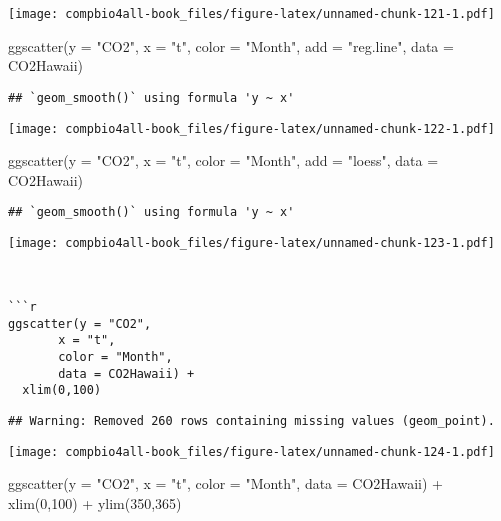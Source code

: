 \documentclass[
]{book}
\newenvironment{Shaded}{\begin{snugshade}}{\end{snugshade}}
\newcommand{\AttributeTok}[1]{\textcolor[rgb]{0.77,0.63,0.00}{#1}}
\newcommand{\DecValTok}[1]{\textcolor[rgb]{0.00,0.00,0.81}{#1}}
\newcommand{\FunctionTok}[1]{\textcolor[rgb]{0.00,0.00,0.00}{#1}}
\newcommand{\NormalTok}[1]{#1}
\newcommand{\SpecialCharTok}[1]{\textcolor[rgb]{0.00,0.00,0.00}{#1}}
\newcommand{\StringTok}[1]{\textcolor[rgb]{0.31,0.60,0.02}{#1}}
\begin{document}
\texttt{[image: compbio4all-book\_files/figure-latex/unnamed-chunk-121-1.pdf]}

\begin{Shaded}
\begin{Highlighting}[]
\FunctionTok{ggscatter}\NormalTok{(}\AttributeTok{y =} \StringTok{"CO2"}\NormalTok{,}
       \AttributeTok{x =} \StringTok{"t"}\NormalTok{,}
       \AttributeTok{color =} \StringTok{"Month"}\NormalTok{,}
       \AttributeTok{add =} \StringTok{"reg.line"}\NormalTok{,}
       \AttributeTok{data =}\NormalTok{ CO2Hawaii)}
\end{Highlighting}
\end{Shaded}

\begin{verbatim}
## `geom_smooth()` using formula 'y ~ x'
\end{verbatim}

\texttt{[image: compbio4all-book\_files/figure-latex/unnamed-chunk-122-1.pdf]}

\begin{Shaded}
\begin{Highlighting}[]
\FunctionTok{ggscatter}\NormalTok{(}\AttributeTok{y =} \StringTok{"CO2"}\NormalTok{,}
       \AttributeTok{x =} \StringTok{"t"}\NormalTok{,}
       \AttributeTok{color =} \StringTok{"Month"}\NormalTok{,}
       \AttributeTok{add =} \StringTok{"loess"}\NormalTok{,}
       \AttributeTok{data =}\NormalTok{ CO2Hawaii)}
\end{Highlighting}
\end{Shaded}

\begin{verbatim}
## `geom_smooth()` using formula 'y ~ x'
\end{verbatim}

\texttt{[image: compbio4all-book\_files/figure-latex/unnamed-chunk-123-1.pdf]}

\begin{verbatim}


```r
ggscatter(y = "CO2",
       x = "t",
       color = "Month",
       data = CO2Hawaii) +
  xlim(0,100)
\end{verbatim}

\begin{verbatim}
## Warning: Removed 260 rows containing missing values (geom_point).
\end{verbatim}

\texttt{[image: compbio4all-book\_files/figure-latex/unnamed-chunk-124-1.pdf]}

\begin{Shaded}
\begin{Highlighting}[]
\FunctionTok{ggscatter}\NormalTok{(}\AttributeTok{y =} \StringTok{"CO2"}\NormalTok{,}
       \AttributeTok{x =} \StringTok{"t"}\NormalTok{,}
       \AttributeTok{color =} \StringTok{"Month"}\NormalTok{,}
       \AttributeTok{data =}\NormalTok{ CO2Hawaii) }\SpecialCharTok{+}
  \FunctionTok{xlim}\NormalTok{(}\DecValTok{0}\NormalTok{,}\DecValTok{100}\NormalTok{) }\SpecialCharTok{+}
  \FunctionTok{ylim}\NormalTok{(}\DecValTok{350}\NormalTok{,}\DecValTok{365}\NormalTok{)}
\end{Highlighting}
\end{Shaded}
\end{document}

